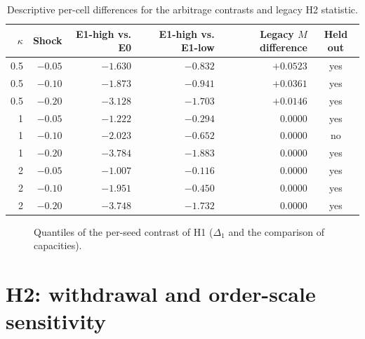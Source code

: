 \begin{table}[htbp]
\centering
\caption{Descriptive per-cell differences for the arbitrage contrasts and legacy H2 statistic.}
\label{tab:celdas}
\small
\begin{tabular}{@{}rrrrrc@{}}
\toprule
$\kappa$ & Shock & E1-high vs. E0 & E1-high vs. E1-low & Legacy $M$ difference & Held out \\
\midrule
0.5 & $-0.05$ & $-1.630$ & $-0.832$ & $+0.0523$ & yes \\
0.5 & $-0.10$ & $-1.873$ & $-0.941$ & $+0.0361$ & yes \\
0.5 & $-0.20$ & $-3.128$ & $-1.703$ & $+0.0146$ & yes \\
1 & $-0.05$ & $-1.222$ & $-0.294$ & $0.0000$ & yes \\
1 & $-0.10$ & $-2.023$ & $-0.652$ & $0.0000$ & no \\
1 & $-0.20$ & $-3.784$ & $-1.883$ & $0.0000$ & yes \\
2 & $-0.05$ & $-1.007$ & $-0.116$ & $0.0000$ & yes \\
2 & $-0.10$ & $-1.951$ & $-0.450$ & $0.0000$ & yes \\
2 & $-0.20$ & $-3.748$ & $-1.732$ & $0.0000$ & yes \\
\bottomrule
\end{tabular}
\end{table}

\begin{figure}[htbp]
\centering
{}
\caption{Quantiles of the per-seed contrast of H1 ($\Delta_1$ and the comparison of capacities).}
\label{fig:cuantiles}
\end{figure}

\section{H2: withdrawal and order-scale sensitivity}
\label{sec:res-h2}

